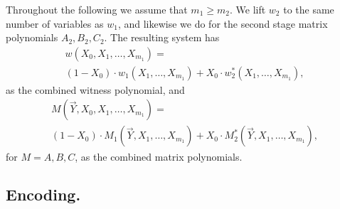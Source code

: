 Throughout the following we assume that $m_1\geq m_2$. 
We lift $w_2$ to the same number of variables as $w_1$, and likewise we do for the second stage matrix polynomials $A_2, B_2, C_2$.
The resulting system has
\begin{multline}
\label{e:combined:witness:poly}
w(X_0,X_1,\ldots, X_{m_1}) =
\\
(1- X_0) \cdot w_1(X_1, \ldots, X_{m_1}) + X_0 \cdot w_2^*(X_{1},\ldots, X_{m_1}),
\end{multline}
as the combined witness polynomial, 
and
\begin{multline}
\label{e:combined:matrix:poly}
M(\vec Y,X_0,X_1,\ldots, X_{m_1}) =
\\
(1- X_0) \cdot M_1(\vec Y, X_1, \ldots, X_{m_1}) +
 X_0 \cdot  M_2^*(\vec Y, X_1,\ldots, X_{m_1}),
\end{multline}
for $M=A,B,C$, as the combined matrix polynomials.





\subsection{Encoding.}

